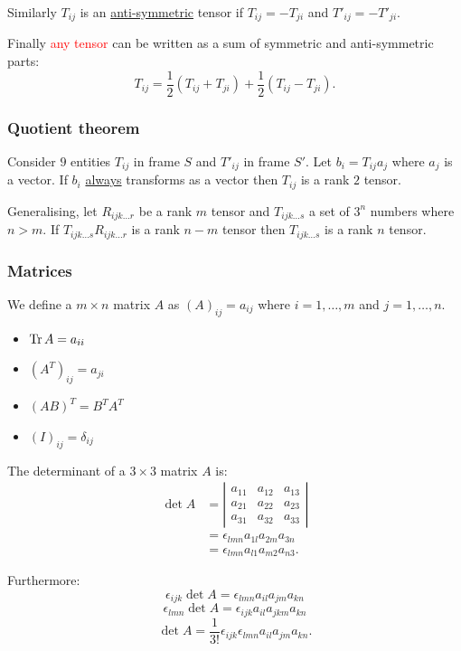 \documentclass{article}
\begin{document}
\begin{multicols*}{3}
Similarly $T_{ij}$ is an \underline{anti-symmetric}
tensor if $T_{ij}=-T_{ji}$ and
$T'_{ij}=-T'_{ji}$.

Finally \textcolor{red}{any tensor} can be written as
a sum of symmetric and anti-symmetric parts:
$$T_{ij}=\frac{1}{2}(T_{ij}+T_{ji})
+\frac{1}{2}(T_{ij}-T_{ji}).$$

\subsubsection*{Quotient theorem}
Consider $9$ entities $T_{ij}$ in frame $S$
and $T'_{ij}$ in frame $S'$. Let $b_i=T_{ij}a_j$
where $a_j$ is a vector.
If $b_i$ \underline{always} transforms as a vector
then $T_{ij}$ is a rank $2$ tensor.

Generalising, let $R_{ijk\dots r}$ be a rank $m$
tensor and $T_{ijk\dots s}$ a set of $3^n$ numbers
where $n>m$. If $T_{ijk\dots s}R_{ijk\dots r}$
is a rank $n-m$ tensor then $T_{ijk\dots s}$
is a rank $n$ tensor.

\subsubsection*{Matrices}
We define a $m\times n$ matrix $A$ as $(A)_{ij}=a_{ij}$
where $i=1,\dots,m$ and $j=1,\dots,n$.
\begin{itemize}
    \item $\Trace A=a_{ii}$
    \item $(A^T)_{ij}=a_{ji}$
    \item $(AB)^T=B^T A^T$
    \item $(I)_{ij}=\delta_{ij}$
\end{itemize}
The determinant of a $3\times3$ matrix $A$ is:
\begin{align*}
    \det A
    &=\left|
        \begin{array}{lll}
            a_{11} & a_{12} & a_{13} \\
            a_{21} & a_{22} & a_{23} \\
            a_{31} & a_{32} & a_{33}
        \end{array}
    \right| \\
    &=\epsilon_{lmn}a_{1l}a_{2m}a_{3n} \\
    &=\epsilon_{lmn}a_{l1}a_{m2}a_{n3}.
\end{align*}

Furthermore:
$$\epsilon_{ijk}\det A=
\epsilon_{lmn}a_{il}a_{jm}a_{kn}$$
$$\epsilon_{lmn}\det A=
\epsilon_{ijk}a_{il}a_{jkm}a_{kn}$$
$$\det A=\frac{1}{3!}\epsilon_{ijk}
\epsilon_{lmn}a_{il}a_{jm}a_{kn}.$$


\end{multicols*}
\end{document}
